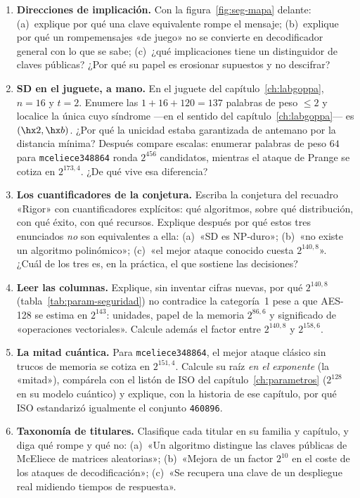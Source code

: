 \begin{enumerate}[leftmargin=1.6em,itemsep=4pt]
  \item \textbf{Direcciones de implicación.} Con la
        figura~\ref{fig:seg-mapa} delante: (a)~explique por qué una
        clave equivalente rompe el mensaje; (b)~explique por qué un
        rompemensajes «de juego» no se convierte en decodificador
        general con lo que se sabe; (c)~¿qué implicaciones tiene un
        distinguidor de claves públicas? ¿Por qué su papel es
        erosionar supuestos y no descifrar?
  \item \textbf{SD en el juguete, a mano.} En el juguete del
        capítulo~\ref{ch:labgoppa}, $n=16$ y $t=2$. Enumere las
        $1+16+120=137$ palabras de peso $\le2$ y localice la única
        cuyo síndrome ---en el sentido del
        capítulo~\ref{ch:labgoppa}--- es $(\hx2,\hx b)$. ¿Por qué
        la unicidad estaba garantizada de antemano por la distancia
        mínima? Después compare escalas: enumerar palabras de peso
        $64$ para \texttt{mceliece348864} ronda $2^{456}$ candidatos,
        mientras el ataque de Prange se cotiza en $2^{173{,}4}$.
        ¿De qué vive esa diferencia?
  \item \textbf{Los cuantificadores de la conjetura.} Escriba la
        conjetura del recuadro «Rigor» con cuantificadores
        explícitos: qué algoritmos, sobre qué distribución, con qué
        éxito, con qué recursos. Explique después por qué estos tres
        enunciados \emph{no} son equivalentes a ella:
        (a)~«SD es NP-duro»; (b)~«no existe un algoritmo
        polinómico»; (c)~«el mejor ataque conocido cuesta
        $2^{140{,}8}$». ¿Cuál de los tres es, en la práctica, el que
        sostiene las decisiones?
  \item \textbf{Leer las columnas.} Explique, sin inventar cifras
        nuevas, por qué $2^{140{,}8}$ (tabla~\ref{tab:param-seguridad})
        no contradice la categoría~1 pese a que AES-128 se estima en
        $2^{143}$: unidades, papel de la memoria $2^{86{,}6}$ y
        significado de «operaciones vectoriales». Calcule además el
        factor entre $2^{140{,}8}$ y $2^{158{,}6}$.
  \item \textbf{La mitad cuántica.} Para \texttt{mceliece348864}, el
        mejor ataque clásico sin trucos de memoria se cotiza en
        $2^{151{,}4}$. Calcule su raíz \emph{en el exponente} (la
        «mitad»), compárela con el listón de ISO del
        capítulo~\ref{ch:parametros} ($2^{128}$ en su modelo
        cuántico) y explique, con la historia de ese capítulo, por
        qué ISO estandarizó igualmente el conjunto \texttt{460896}.
  \item \textbf{Taxonomía de titulares.} Clasifique cada titular en
        su familia y capítulo, y diga qué rompe y qué no:
        (a)~«Un algoritmo distingue las claves públicas de McEliece
        de matrices aleatorias»; (b)~«Mejora de un factor $2^{10}$
        en el coste de los ataques de decodificación»; (c)~«Se
        recupera una clave de un despliegue real midiendo tiempos de
        respuesta».
\end{enumerate}
